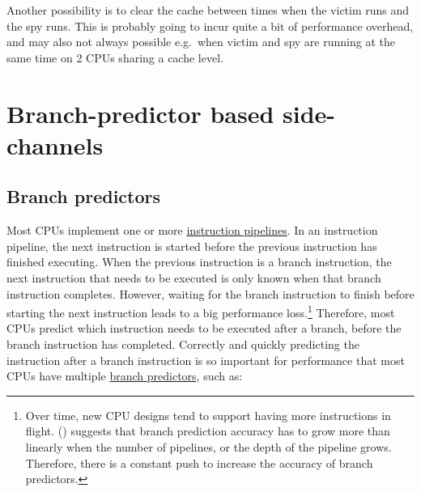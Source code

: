 \documentclass[
  a4paper,
]{report}
\begin{document}
Another possibility is to clear the cache between times when the victim
runs and the spy runs. This is probably going to incur quite a bit of
performance overhead, and may also not always possible e.g.~when victim
and spy are running at the same time on 2 CPUs sharing a cache level.

\section{Branch-predictor based
side-channels}\label{branch-predictor-based-side-channels}

\subsection{Branch predictors}\label{branch-predictors}

Most CPUs implement one or more
\href{https://en.wikipedia.org/wiki/Instruction_pipelining}{\label{__index_entry_139}{instruction
pipelines}}.
\label{__index_entry_140}{} In an
instruction pipeline, the next instruction is started before the
previous instruction has finished executing. When the previous
instruction is a branch instruction, the next instruction that needs to
be executed is only known when that branch instruction completes.
However, waiting for the branch instruction to finish before starting
the next instruction leads to a big performance loss.\footnote{Over
  time, new CPU designs tend to support having more instructions in
  flight. ()
  suggests that branch prediction accuracy has to grow more than
  linearly when the number of pipelines, or the depth of the pipeline
  grows. Therefore, there is a constant push to increase the accuracy of
  branch predictors.} Therefore, most CPUs
\label{__index_entry_141}{predict} which
instruction needs to be executed after a branch, before the branch
instruction has completed. Correctly and quickly predicting the
instruction after a branch instruction is so important for performance
that most CPUs have multiple
\href{https://en.wikipedia.org/wiki/Branch_predictor}{\label{__index_entry_142}{branch
predictors}}, such as:
\end{document}
